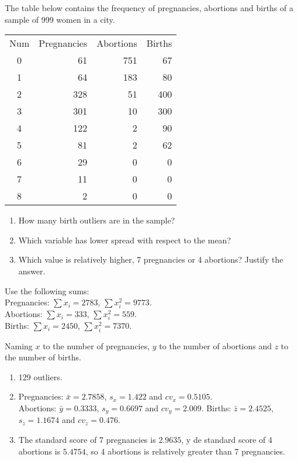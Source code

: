{The table below contains the frequency of pregnancies, abortions and
births of a sample of 999 women in a city.

\begin{center}
\begin{tabular}{crrr}
\toprule
Num & Pregnancies & Abortions & Births\\
0 & 61 & 751 & 67 \\
1 & 64 & 183 & 80 \\
2 & 328 & 51 & 400 \\
3 & 301 & 10 & 300 \\
4 & 122 & 2 & 90 \\
5 & 81 & 2 & 62 \\
6 & 29 & 0 & 0 \\
7 & 11 & 0 & 0 \\
8 & 2 & 0 & 0 \\
\bottomrule
\end{tabular}
\end{center}

\begin{enumerate}
\item How many birth outliers are in the sample?
\item Which variable has lower spread with respect to the mean?
\item Which value is relatively higher, 7 pregnancies or 4 abortions? Justify the answer.
\end{enumerate}

Use the following sums:\\
Pregnancies: $\sum x_i= 2783$, $\sum x_i^2=9773$.\\
Abortions: $\sum x_i= 333$, $\sum x_i^2=559$.\\
Births: $\sum x_i= 2450$, $\sum x_i^2=7370$.
}
{
Naming $x$ to the number of pregnancies, $y$ to the number of abortions and $z$ to the number of births.
\begin{enumerate}
\item 129 outliers.
\item Pregnancies: $\bar{x}=2.7858$, $s_x=1.422$ and $cv_x=0.5105$.\\
Abortions: $\bar{y}=0.3333$, $s_y=0.6697$ and $cv_y=2.009$.
Births: $\bar{z}=2.4525$, $s_z=1.1674$ and $cv_z=0.476$.
\item The standard score of 7 pregnancies is $2.9635$, y de standard score of 4 abortions is $5.4754$, so 4 abortions is relatively greater than 7 pregnancies.
\end{enumerate}
}
{
}
